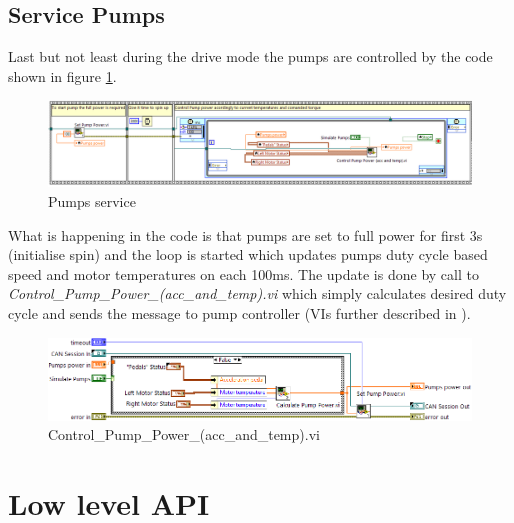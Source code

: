 \subsection{Service Pumps}
Last but not least during the drive mode the pumps are controlled by the code shown in figure \ref{pumps_service}.
\begin{figure}[H]
    \centering
    \includegraphics[width=\textwidth]{figures/Pumps}
    \caption{Pumps service}
    \label{pumps_service}
\end{figure}
What is happening in the code is that pumps are set to full power for first 3s (initialise spin) and the loop is started which updates pumps duty cycle based speed and motor temperatures on each 100ms.
The update is done by call to \textit{Control\_Pump\_Power\_(acc\_and\_temp).vi} which simply calculates desired duty cycle and sends the message to pump controller (VIs further described in ).
\begin{figure}[H]
    \centering
    \includegraphics[width=\textwidth]{figures/Control_Pump_Power_(acc_and_temp)d_e}
    \caption{Control\_Pump\_Power\_(acc\_and\_temp).vi}
    \label{vi:Control_Pump_Power_(acc_and_temp)}
\end{figure}

\section{Low level API}
